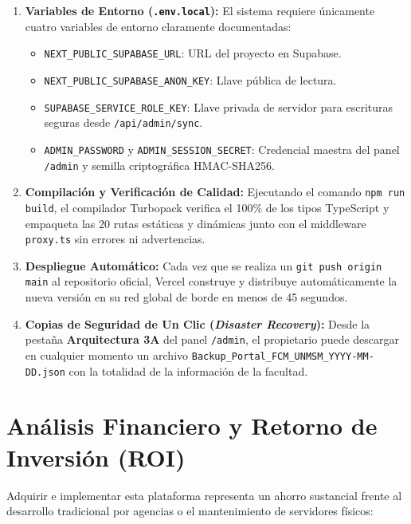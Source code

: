 \documentclass[12pt,a4paper,oneside]{report}
\begin{document}
\begin{enumerate}[label=\textbf{Paso \arabic*:}, leftmargin=1.6cm]
  \item \textbf{Variables de Entorno (\texttt{.env.local}):} El sistema requiere únicamente cuatro variables de entorno claramente documentadas:
    \begin{itemize}[leftmargin=0.6cm]
      \item \texttt{NEXT\_PUBLIC\_SUPABASE\_URL}: URL del proyecto en Supabase.
      \item \texttt{NEXT\_PUBLIC\_SUPABASE\_ANON\_KEY}: Llave pública de lectura.
      \item \texttt{SUPABASE\_SERVICE\_ROLE\_KEY}: Llave privada de servidor para escrituras seguras desde \texttt{/api/admin/sync}.
      \item \texttt{ADMIN\_PASSWORD} y \texttt{ADMIN\_SESSION\_SECRET}: Credencial maestra del panel \texttt{/admin} y semilla criptográfica HMAC-SHA256.
    \end{itemize}
  \item \textbf{Compilación y Verificación de Calidad:} Ejecutando el comando \texttt{npm run build}, el compilador Turbopack verifica el 100\% de los tipos TypeScript y empaqueta las 20 rutas estáticas y dinámicas junto con el middleware \texttt{proxy.ts} sin errores ni advertencias.
  \item \textbf{Despliegue Automático:} Cada vez que se realiza un \texttt{git push origin main} al repositorio oficial, Vercel construye y distribuye automáticamente la nueva versión en su red global de borde en menos de 45 segundos.
  \item \textbf{Copias de Seguridad de Un Clic (\textit{Disaster Recovery}):} Desde la pestaña \textbf{Arquitectura 3A} del panel \texttt{/admin}, el propietario puede descargar en cualquier momento un archivo \texttt{Backup\_Portal\_FCM\_UNMSM\_YYYY-MM-DD.json} con la totalidad de la información de la facultad.
\end{enumerate}

\section{Análisis Financiero y Retorno de Inversión (ROI)}
Adquirir e implementar esta plataforma representa un ahorro sustancial frente al desarrollo tradicional por agencias o el mantenimiento de servidores físicos:
\end{document}
